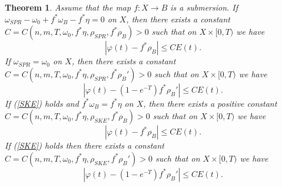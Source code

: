 \documentclass[12pt]{article}
\newtheorem{theorem}{Theorem}[section]
\numberwithin{equation}{section}
\begin{document}
\begin{theorem}
Assume that the map $f: X \to B$ is a submersion. If $\omega_{SPR} - \omega_0 + f^*\omega_B - f^*\eta = 0$ on $X$, then there exists a constant $C = C(n,m,T,\omega_0,f^*\eta,\rho_{SPR},f^*\rho_B) > 0$ such that on $X \times [0,T)$ we have
\begin{equation*}
    \left|\varphi(t) - f^*\rho_B\right| \leq CE(t).
\end{equation*}
If $\omega_{SPR} = \omega_{0}$ on $X$, then there exists a constant $C = C(n,m,T,\omega_0,f^*\eta, \rho_{SPR}, f^*\rho_B') > 0$ such that on $X \times [0,T)$ we have
\begin{equation*}
    \left|\varphi(t) - (1-e^{-T}) f^*\rho_B'\right| \leq CE(t).
\end{equation*}
If (\ref{SKE}) holds and $f^*\omega_{B} = f^*\eta$ on $X$, then there exists a positive constant $C = C(n,m,T,\omega_0,f^*\eta,\rho_{SKE}, f^*\rho_B) > 0$ such that on $X \times [0,T)$ we have
\begin{equation*}
    \left|\varphi(t) - f^*\rho_B\right| \leq CE(t).
\end{equation*}
If (\ref{SKE}) holds then there exists a constant $C = C(n,m,T,\omega_0,f^*\eta, \rho_{SKE},f^*\rho_B') > 0$ such that on $X \times [0,T)$ we have
\begin{equation*}
    \left|\varphi(t) - (1-e^{-T}) f^*\rho_B'\right| \leq CE(t).
\end{equation*}
\end{theorem}
\end{document}
